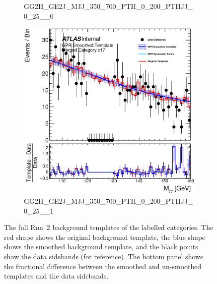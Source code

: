 \begin{figure}
\begin{center}
\begin{subfigure}[T]{0.49\linewidth}
	\caption{\tiny{GG2H\_GE2J\_MJJ\_350\_700\_PTH\_0\_200\_PTHJJ\_0\_25\_\_0}}
\end{subfigure}
\begin{subfigure}[T]{0.49\linewidth}
	\centering
	\includegraphics[width=\linewidth]{figures/background/gpr/coupCatTemplates/GPR_Smoothed_Plot_hmgg_c17.eps}
	\caption{\tiny{GG2H\_GE2J\_MJJ\_350\_700\_PTH\_0\_200\_PTHJJ\_0\_25\_\_1}}
\end{subfigure}
\caption{The full Run~2 background templates of the labelled categories. The red shape shows the original background template, the blue shape shows the smoothed background template, and the black points show the data sidebands (for reference). The bottom panel shows the fractional difference between the smoothed and un-smoothed templates and the data sidebands. }
 \label{fig:gpr_coupcat_4}
 \end{center}
\end{figure}

